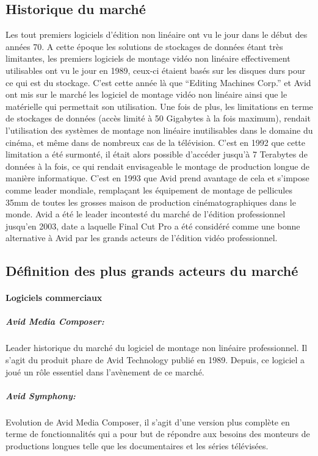 \subsection {Historique du marché}
Les tout premiers logiciels d'édition non linéaire ont vu le jour dans le début des années 70.
A cette époque les solutions de stockages de données étant très limitantes, les premiers logiciels de montage
vidéo non linéaire effectivement utilisables ont vu le jour en 1989, ceux-ci étaient basés sur les disques durs
pour ce qui est du stockage. C'est cette année là que ``Editing Machines Corp.'' et Avid ont mis sur le
marché les logiciel de montage vidéo non linéaire ainsi que le matérielle qui permettait son
utilisation. Une fois de plus, les limitations en terme de stockages de données (accès limité à 50 Gigabytes
à la fois maximum), rendait l'utilisation des systèmes de montage non linéaire inutilisables dans le domaine
du cinéma, et même dans de nombreux cas de la télévision. C'est en 1992 que cette limitation a été surmonté,
il était alors possible d'accéder jusqu'à 7 Terabytes de données à la fois, ce qui rendait envisageable le montage
de production longue de manière informatique. C'est en 1993 que Avid prend avantage de cela et s'impose
comme leader mondiale, remplaçant les équipement de montage de pellicules 35mm de toutes les grosses maison
de production cinématographiques dans le monde. Avid a été le leader incontesté du marché de l'édition
professionnel jusqu'en 2003, date a laquelle Final Cut Pro a été considéré comme une bonne alternative
à Avid par les grands acteurs de l'édition vidéo professionnel.

\subsection{Définition des plus grands acteurs du marché}

\paragraph {Logiciels commerciaux}

\subparagraph{Avid Media Composer:}
Leader historique du marché du logiciel de montage non linéaire
professionnel. Il s'agit du produit phare de Avid Technology publié en 1989. Depuis, ce
logiciel a joué un rôle essentiel dans l'avènement de ce marché.

\subparagraph{Avid Symphony:}
Evolution de Avid Media Composer, il s'agit d'une version plus complète en terme
de fonctionnalités qui a pour but de répondre aux besoins des monteurs de productions longues telle que
les documentaires et les séries télévisées.

